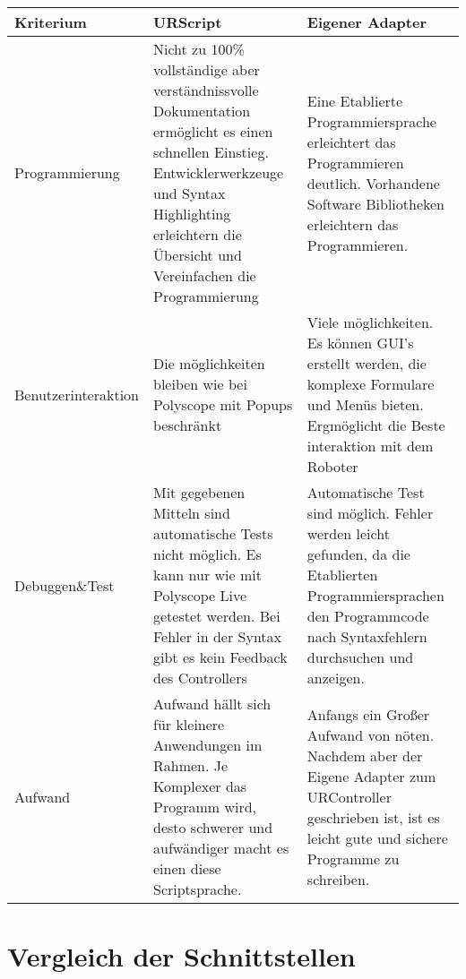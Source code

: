 \begin{minipage}[h]
 {\textwidth}
  \begin{tabular}{|p{}|p{}|p{}|}
   \hline
   	\textbf{Kriterium} & \textbf{URScript} & \textbf{Eigener Adapter}\\ \hline \hline 

     Programmierung & Nicht zu 100\% vollständige aber verständnissvolle Dokumentation ermöglicht es einen schnellen Einstieg. Entwicklerwerkzeuge und \ac{Syntax Highlighting} erleichtern die Übersicht und Vereinfachen die Programmierung & Eine Etablierte Programmiersprache erleichtert das Programmieren deutlich. Vorhandene \ac{Software Bibliotheken} erleichtern das Programmieren.
     \\ 
     \hline 
	 Benutzerinteraktion & Die möglichkeiten bleiben wie bei Polyscope mit Popups beschränkt & Viele möglichkeiten. Es können \ac{GUI}'s erstellt werden, die komplexe Formulare und Menüs bieten. Ergmöglicht die Beste interaktion mit dem Roboter
     \\ 
     \hline 
     Debuggen\&Test & Mit gegebenen Mitteln sind automatische Tests nicht möglich. Es kann nur wie mit Polyscope Live getestet werden. Bei Fehler in der Syntax gibt es kein Feedback des Controllers & Automatische Test sind möglich. Fehler werden leicht gefunden, da die Etablierten Programmiersprachen den Programmcode nach Syntaxfehlern durchsuchen und anzeigen.
     \\ 
     \hline 
     Aufwand & Aufwand hällt sich für kleinere Anwendungen im Rahmen. Je Komplexer das Programm wird, desto schwerer und aufwändiger macht es einen diese Scriptsprache. & Anfangs ein Großer Aufwand von nöten. Nachdem aber der Eigene Adapter zum URController geschrieben ist, ist es leicht gute und sichere Programme zu schreiben.
     \\ 
     \hline 
  \end{tabular}
 \label{tab:vgl_interfaces}
\end{minipage}

\section{Vergleich der Schnittstellen}

